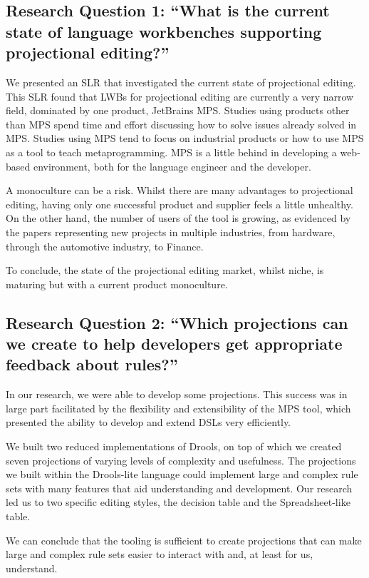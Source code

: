 \subsection{Research Question 1: ``What is the current state of language workbenches supporting projectional editing?''}
We presented an SLR that investigated the current state of projectional editing.
This SLR found that LWBs for projectional editing are currently a very narrow field, dominated by one product, JetBrains MPS.
Studies using products other than MPS spend time and effort discussing how to solve issues already solved in MPS.
Studies using MPS tend to focus on industrial products or how to use MPS as a tool to teach metaprogramming.
MPS is a little behind in developing a web-based environment, both for the language engineer and the developer.

A monoculture can be a risk.
Whilst there are many advantages to projectional editing, having only one successful product and supplier feels a little unhealthy.
On the other hand, the number of users of the tool is growing, as evidenced by the papers representing new projects in multiple industries, from hardware, through the automotive industry, to Finance.

To conclude, the state of the projectional editing market, whilst niche, is maturing but with a current product monoculture.

\subsection{Research Question 2: ``Which projections can we create to help developers get appropriate feedback about rules?''}

In our research, we were able to develop some projections.  
This success was in large part facilitated by the flexibility and extensibility of the MPS tool, which presented the ability to develop and extend DSLs very efficiently.

We built two reduced implementations of Drools, on top of which we created seven projections of varying levels of complexity and usefulness.
The projections we built within the Drools-lite language could implement large and complex rule sets with many features that aid understanding and development.
Our research led us to two specific editing styles, the decision table and the Spreadsheet-like table.

We can conclude that the tooling is sufficient to create projections that can make large and complex rule sets easier to interact with and, at least for us, understand.

